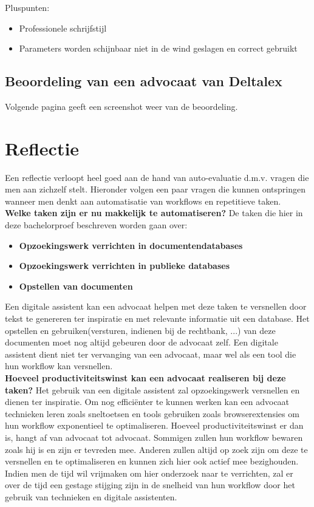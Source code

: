 Pluspunten:
\begin{itemize}
	\item Professionele schrijfstijl
	\item Parameters worden schijnbaar niet in de wind geslagen en correct gebruikt
\end{itemize}

\subsection{Beoordeling van een advocaat van Deltalex}
Volgende pagina geeft een screenshot weer van de beoordeling. 
\begin{figure}
\end{figure}

\newpage
\section{Reflectie}
Een reflectie verloopt heel goed aan de hand van auto-evaluatie d.m.v. vragen die men aan zichzelf stelt.
Hieronder volgen een paar vragen die kunnen ontspringen wanneer men denkt aan automatisatie van workflows en repetitieve taken.\\

\textbf{Welke taken zijn er nu makkelijk te automatiseren?}
De taken die hier in deze bachelorproef beschreven worden gaan over:
\begin{itemize}
	\item \textbf{Opzoekingswerk verrichten in documentendatabases}
	\item \textbf{Opzoekingswerk verrichten in publieke databases}
	\item \textbf{Opstellen van documenten}
\end{itemize}
Een digitale assistent kan een advocaat helpen met deze taken te versnellen door tekst te genereren ter inspiratie en met relevante informatie uit een database.
Het opstellen en gebruiken(versturen, indienen bij de rechtbank, ...) van deze documenten moet nog altijd gebeuren door de advocaat zelf.
Een digitale assistent dient niet ter vervanging van een advocaat, maar wel als een tool die hun workflow kan versnellen. \\

\textbf{Hoeveel productiviteitswinst kan een advocaat realiseren bij deze taken?}
Het gebruik van een digitale assistent zal opzoekingswerk versnellen en dienen ter inspiratie.
Om nog efficiënter te kunnen werken kan een advocaat technieken leren zoals sneltoetsen en tools gebruiken zoals browserextensies om hun workflow exponentieel te optimaliseren.
Hoeveel productiviteitswinst er dan is, hangt af van advocaat tot advocaat.
Sommigen zullen hun workflow bewaren zoals hij is en zijn er tevreden mee.
Anderen zullen altijd op zoek zijn om deze te versnellen en te optimaliseren en kunnen zich hier ook actief mee bezighouden.
Indien men de tijd wil vrijmaken om hier onderzoek naar te verrichten, zal er over de tijd een gestage stijging
zijn in de snelheid van hun workflow door het gebruik van technieken en digitale assistenten. \\

